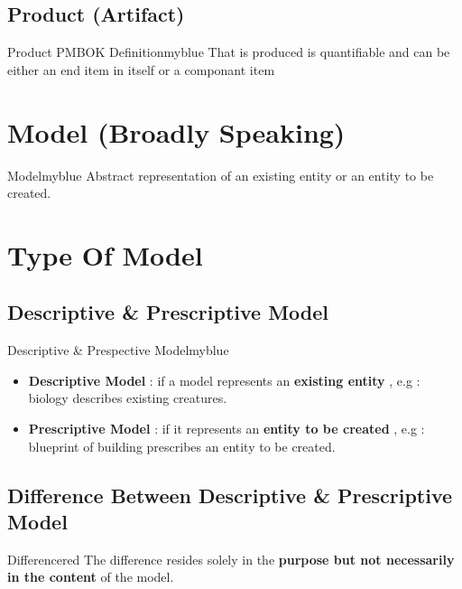 \documentclass{report}
\begin{document}
\vspace{0.15cm}
\subsection{Product (Artifact)}
\begin{prettyBox}{Product PMBOK Definition}{myblue}
    That is produced is quantifiable and can be either an end item in itself or a componant item
\end{prettyBox}

\vspace{0.15cm}
\section{Model (Broadly Speaking)}
\begin{prettyBox}{Model}{myblue}
    Abstract representation of an existing entity or an entity to be created.
\end{prettyBox}

\vspace{0.25cm}

\section{Type Of Model}
\subsection{Descriptive \& Prescriptive Model}
\begin{prettyBox}{Descriptive \& Prespective Model}{myblue}
    \begin{itemize}
        \item \textbf{Descriptive Model} : if a model represents an \textbf{existing entity} , e.g : biology describes existing creatures.
        \item \textbf{Prescriptive Model} : if it represents an \textbf{entity to be created} , e.g : blueprint of building prescribes an entity to be created.
    \end{itemize}
\end{prettyBox}

\vspace{0.15cm}
\subsection{Difference Between Descriptive \& Prescriptive Model}
\begin{prettyBox}{Difference}{red}
    The difference resides solely in the \textbf{purpose but not necessarily in the content} of the model.
\end{prettyBox}
\end{document}
